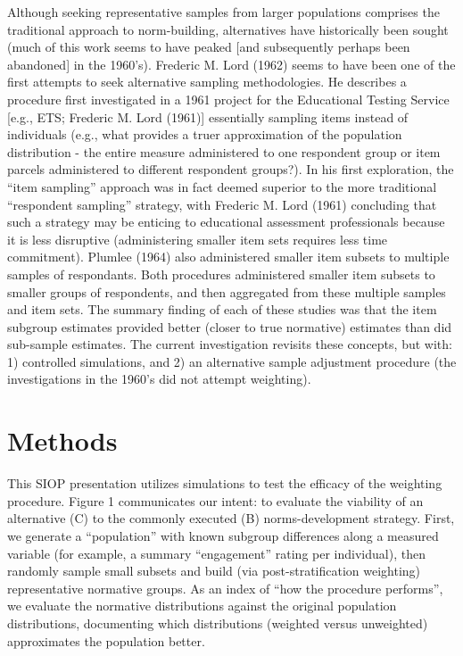 \documentclass[
  ,man]{apa6}
\begin{document}
Although seeking representative samples from larger populations comprises the traditional approach to norm-building, alternatives have historically been sought (much of this work seems to have peaked {[}and subsequently perhaps been abandoned{]} in the 1960's). Frederic M. Lord (1962) seems to have been one of the first attempts to seek alternative sampling methodologies. He describes a procedure first investigated in a 1961 project for the Educational Testing Service {[}e.g., ETS; Frederic M. Lord (1961){]} essentially sampling items instead of individuals (e.g., what provides a truer approximation of the population distribution - the entire measure administered to one respondent group or item parcels administered to different respondent groups?). In his first exploration, the ``item sampling'' approach was in fact deemed superior to the more traditional ``respondent sampling'' strategy, with Frederic M. Lord (1961) concluding that such a strategy may be enticing to educational assessment professionals because it is less disruptive (administering smaller item sets requires less time commitment). Plumlee (1964) also administered smaller item subsets to multiple samples of respondants. Both procedures administered smaller item subsets to smaller groups of respondents, and then aggregated from these multiple samples and item sets. The summary finding of each of these studies was that the item subgroup estimates provided better (closer to true normative) estimates than did sub-sample estimates. The current investigation revisits these concepts, but with: 1) controlled simulations, and 2) an alternative sample adjustment procedure (the investigations in the 1960's did not attempt weighting).

\hypertarget{methods}{%
\section{Methods}\label{methods}}

This SIOP presentation utilizes simulations to test the efficacy of the weighting procedure. Figure 1 communicates our intent: to evaluate the viability of an alternative (C) to the commonly executed (B) norms-development strategy. First, we generate a ``population'' with known subgroup differences along a measured variable (for example, a summary ``engagement'' rating per individual), then randomly sample small subsets and build (via post-stratification weighting) representative normative groups. As an index of ``how the procedure performs'', we evaluate the normative distributions against the original population distributions, documenting which distributions (weighted versus unweighted) approximates the population better.
\end{document}
